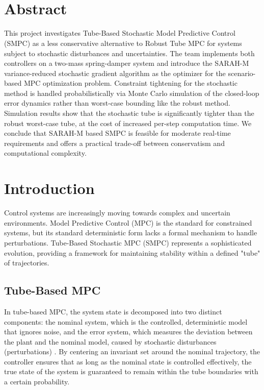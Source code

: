 \documentclass[11pt]{article}
\title{\textbf{\course} \\ \assignment}
\author{\name}
\date{\datefixed}
\begin{document}
\maketitle
\section*{Abstract}
This project investigates Tube-Based Stochastic Model Predictive Control (SMPC) as a less conservative alternative to Robust Tube MPC for systems subject to stochastic disturbances and uncertainties. The team implements both controllers on a two-mass spring-damper system and introduce the SARAH-M variance-reduced stochastic gradient algorithm as the optimizer for the scenario-based MPC optimization problem. Constraint tightening for the stochastic method is handled probabilistically via Monte Carlo simulation of the closed-loop error dynamics rather than worst-case bounding like the robust method. Simulation results show that the stochastic tube is significantly tighter than the robust worst-case tube, at the cost of increased per-step computation time. We conclude that SARAH-M based SMPC is feasible for moderate real-time requirements and offers a practical trade-off between conservatism and computational complexity.

\section{Introduction}
Control systems are increasingly moving towards complex and uncertain environments.
Model Predictive Control (MPC) is the standard for constrained systems, but its standard deterministic form lacks a formal mechanism to handle perturbations.
Tube-Based Stochastic MPC (SMPC) represents a sophisticated evolution, providing a framework for maintaining stability within a defined "tube" of trajectories.

\subsection{Tube-Based MPC}
In tube-based MPC, the system state is decomposed into two distinct components: the nominal system, which is the controlled, deterministic model that ignores noise,
and the error system, which measures the deviation between the plant and the nominal model, caused by stochastic disturbances (perturbations) \cite{LANGSON2004125,dey2026adaptivetubempccommon}.
By centering an invariant set around the nominal trajectory, the controller ensures that as long as the nominal state is controlled effectively, the true state of the system is guaranteed to remain within the tube boundaries with a certain probability.
\end{document}
